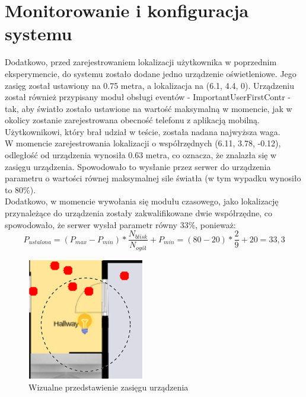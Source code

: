 \section{Monitorowanie i konfiguracja systemu}
Dodatkowo, przed zarejestrowaniem lokalizacji użytkownika w poprzednim eksperymencie, do systemu zostało dodane jedno urządzenie oświetleniowe. Jego zasięg został ustawiony na 0.75 metra, a lokalizacja na (6.1, 4.4, 0). Urządzeniu został również przypisany moduł obsługi eventów - ImportantUserFirstContr - tak, aby światło zostało ustawione na wartość maksymalną w momencie, jak w okolicy zostanie zarejestrowana obecność telefonu z aplikacją mobilną. Użytkownikowi, który brał udział w teście, została nadana najwyższa waga.\\
W momencie zarejestrowania lokalizacji o współrzędnych (6.11, 3.78, -0.12), odległość od urządzenia wynosiła 0.63 metra, co oznacza, że znalazła się w zasięgu urządzenia. Spowodowało to wysłanie przez serwer do urządzenia parametru o wartości równej maksymalnej sile światła (w tym wypadku wynosiło to 80\%).\\
Dodatkowo, w momencie wywołania się modułu czasowego, jako lokalizację przynależące do urządzenia zostały zakwalifikowane dwie współrzędne, co spowodowało, że serwer wysłał parametr równy 33\%, ponieważ:
\begin{equation}
P_{ustalona} = (P_{max} - P_{min}) * \frac{N_{blisk}}{N_{ogół}} + P_{min} = (80 - 20) * \frac{2}{9} + 20 = 33,3
\end{equation}
\begin{figure}[H]			
	\centering
	\caption{Wizualne przedstawienie zasięgu urządzenia}
	\includegraphics{dzialanie_urzadze}
\end{figure}
